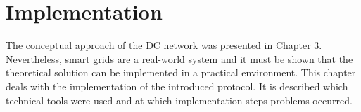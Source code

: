 \chapter{Implementation}
\label{sec:implementation}

The conceptual approach of the DC network was presented in Chapter 3. Nevertheless, smart grids are a real-world system and it must be shown that the theoretical solution can be implemented in a practical environment. This chapter deals with the implementation of the introduced protocol. It is described which technical tools were used and at which implementation steps problems occurred.
